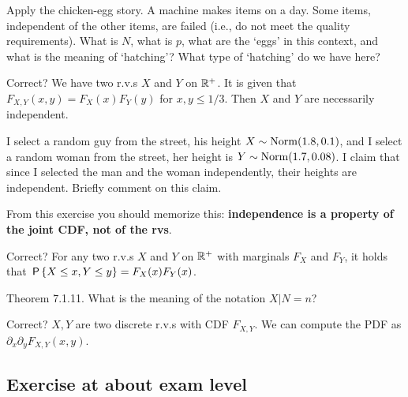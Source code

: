 \documentclass[assignments]{subfiles}
\begin{document}
\begin{exercise}
Apply the chicken-egg story.
A machine makes items on a day.
Some items, independent of the other items, are failed (i.e., do not meet the quality requirements).
What is $N$, what is $p$, what are the `eggs' in this context, and what is the meaning of `hatching'?
What type of `hatching' do we have here?
\end{exercise}



\begin{exercise}
Correct? We have two r.v.s $X$ and $Y$ on $\R^{+}$. It is given that $F_{X,Y}(x,y) = F_X(x)F_Y(y)$ for $x,y \leq 1/3$. Then  $X$ and $Y$ are necessarily independent.
\end{exercise}

\begin{exercise}
I select a random guy from the street, his height $X\sim\Norm{1.8, 0.1}$, and I select a random woman from the street, her height is $Y\sim\Norm{1.7, 0.08}$.
I claim that since I selected the man and the woman independently, their heights are independent.
Briefly comment on this claim.
\begin{hint}
From this exercise you should memorize this: \textbf{independence is a property of the joint CDF, not of the rvs}.
\end{hint}
\end{exercise}


\begin{exercise}
Correct? For any two r.v.s $X$ and $Y$ on $\R^{+}$ with marginals $F_{X}$ and $F_{Y}$, it holds that $\P{X\leq x, Y\leq y} = F_{X}(x) F_{Y}(x)$.
\end{exercise}

\begin{exercise}
Theorem 7.1.11. What is the meaning of the notation $X|N=n$?
\end{exercise}

\begin{exercise}
Correct? $X, Y$ are two discrete r.v.s with CDF $F_{X,Y}$. We can compute the PDF as $\partial_{x}\partial_{y} F_{X,Y}(x,y)$.
\end{exercise}


\subsection{Exercise at about exam level}
\label{sec:below-exam-level}
\end{document}
